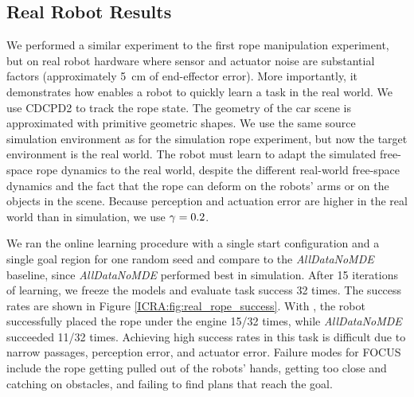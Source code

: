 \subsection{Real Robot Results}

We performed a similar experiment to the first rope manipulation experiment, but on real robot hardware where sensor and actuator noise are substantial factors (approximately \SI{5}{\centi\meter} of end-effector error). More importantly, it demonstrates how \FOCUS{} enables a robot to quickly learn a task in the real world. We use CDCPD2 \cite{CDCPD2} to track the rope state. The geometry of the car scene is approximated with primitive geometric shapes. We use the same source simulation environment as for the  simulation rope experiment, but now the target environment is the real world. The robot must learn to adapt the simulated free-space rope dynamics to the real world, despite the different real-world free-space dynamics and the fact that the rope can deform on the robots' arms or on the objects in the scene. Because perception and actuation error are higher in the real world than in simulation, we use $\gamma=0.2$.

We ran the online learning procedure with a single start configuration and a single goal region for one random seed and compare \FOCUS{} to the \textit{AllDataNoMDE} baseline, since \textit{AllDataNoMDE} performed best in simulation. After 15 iterations of learning, we freeze the models and evaluate task success 32 times. The success rates are shown in Figure \ref{ICRA:fig:real_rope_success}. With \FOCUS{}, the robot successfully placed the rope under the engine 15/32 times, while \textit{AllDataNoMDE} succeeded 11/32 times. Achieving high success rates in this task is difficult due to narrow passages, perception error, and actuator error. Failure modes for FOCUS include the rope getting pulled out of the robots' hands, getting too close and catching on obstacles, and failing to find plans that reach the goal.
